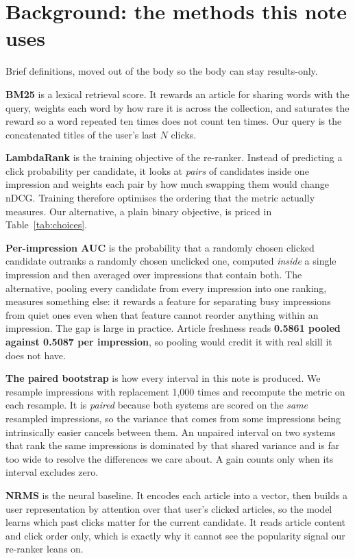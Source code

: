 \section{Background: the methods this note uses}
\label{app:background}

Brief definitions, moved out of the body so the body can stay results-only.

\textbf{BM25} \cite{robertson2009,lu2024bm25s} is a lexical retrieval score. It rewards an article
for sharing words with the query, weights each word by how rare it is across the collection, and
saturates the reward so a word repeated ten times does not count ten times. Our query is the
concatenated titles of the user's last $N$ clicks.

\textbf{LambdaRank} \cite{burges2010} is the training objective of the re-ranker. Instead of
predicting a click probability per candidate, it looks at \emph{pairs} of candidates inside one
impression and weights each pair by how much swapping them would change nDCG. Training therefore
optimises the ordering that the metric actually measures. Our alternative, a plain binary
objective, is priced in Table~\ref{tab:choices}.

\textbf{Per-impression AUC} is the probability that a randomly chosen clicked candidate outranks a
randomly chosen unclicked one, computed \emph{inside} a single impression and then averaged over
impressions that contain both. The alternative, pooling every candidate from every impression into
one ranking, measures something else: it rewards a feature for separating busy impressions from
quiet ones even when that feature cannot reorder anything within an impression. The gap is large
in practice. Article freshness reads \textbf{0.5861 pooled against 0.5087 per impression}, so
pooling would credit it with real skill it does not have.

\textbf{The paired bootstrap} \cite{efron1993} is how every interval in this note is produced. We
resample impressions with replacement 1,000 times and recompute the metric on each resample. It is
\emph{paired} because both systems are scored on the \emph{same} resampled impressions, so the
variance that comes from some impressions being intrinsically easier cancels between them. An
unpaired interval on two systems that rank the same impressions is dominated by that shared
variance and is far too wide to resolve the differences we care about. A gain counts only when its
interval excludes zero.

\textbf{NRMS} \cite{wu2019nrms} is the neural baseline. It encodes each article into a vector, then
builds a user representation by attention over that user's clicked articles, so the model learns
which past clicks matter for the current candidate. It reads article content and click order only,
which is exactly why it cannot see the popularity signal our re-ranker leans on.


